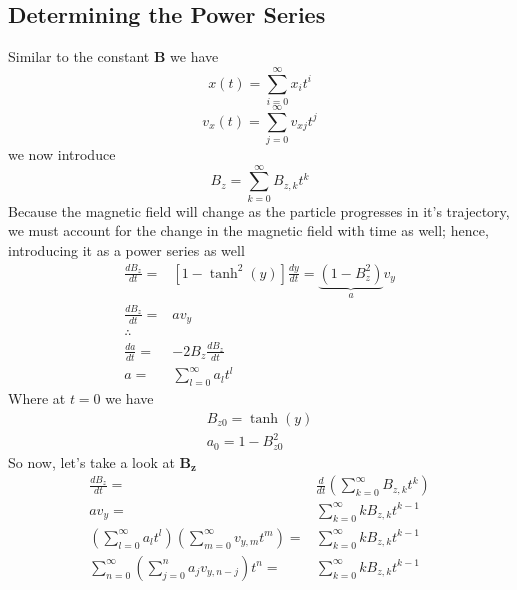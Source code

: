 \documentclass[9pt]{article}
\begin{document}
\begin{multicols}{2}
\subsection{Determining the Power Series}
Similar to the constant $\mathbf{B}$ we have
    \begin{equation}    
        x(t)=\sum_{i=0}^\infty x_it^i 
    \end{equation}
    \begin{equation}
        v_x(t)=\sum_{j=0}^\infty v_{xj}t^j    
    \end{equation}
we now introduce 
    \begin{equation}
        B_z=\sum_{k=0}^\infty B_{z,k}t^k
    \end{equation}
Because the magnetic field will change as the particle progresses in it's trajectory, we must account for the change in the magnetic field with time as well; hence, introducing it as a power series as well  
    \begin{equation}
    \begin{split}
        \frac{dB_z}{dt}=&[1-\tanh^2(y)]\frac{dy}{dt}=\underbrace{(1-B_z^2)}_a v_y\\
        \frac{dB_z}{dt}=&av_y\\
        \therefore\\
        \frac{da}{dt}=&-2B_z\frac{dB_z}{dt}\\
        a=&\sum_{l=0}^\infty a_lt^l
        \end{split}
    \end{equation}
Where at $t=0$ we have 
    \begin{equation}
        \begin{split}
            B_{z0}=\tanh(y)\\
            a_0=1-B_{z0}^2
        \end{split}
    \end{equation}
So now, let's take a look at $\mathbf{B_z}$ 
    \begin{equation}
        \begin{split}
            \frac{dB_z}{dt}=&\frac{d}{dt}\left(\sum_{k=0}^\infty B_{z,k}t^k\right)\\
            av_y=&\sum_{k=0}^\infty kB_{z,k}t^{k-1}\\
            \left(\sum_{l=0}^\infty a_lt^l\right)\left(\sum_{m=0}^\infty v_{y,m}t^m\right)=&\sum_{k=0}^\infty kB_{z,k}t^{k-1}\\                  
            \sum_{n=0}^\infty \left(\sum_{j=0}^n a_jv_{y,n-j}\right)t^n=&\sum_{k=0}^\infty kB_{z,k}t^{k-1}\\

\end{split}
\end{equation}
\end{multicols}
\end{document}
